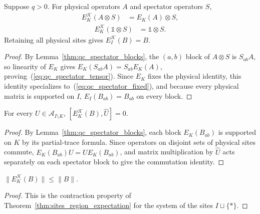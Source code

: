 \begin{lemma}
    \label{thm:qc_spectator_factors}
    \leanok
    Suppose $q>0$. For physical operators $A$ and spectator operators $S$,
    \begin{align}
        E_K^{\mathcal K}(A\otimes S) & =E_K(A)\otimes S,
        \label{eq:qc_spectator_tensor}
    \end{align}
    \begin{align}
        E_K^{\mathcal K}(\mathbb 1\otimes S) & =\mathbb 1\otimes S.
        \label{eq:qc_spectator_fixed}
    \end{align}
    Retaining all physical sites gives $E_I^{\mathcal K}(B)=B$.
\end{lemma}
\begin{proof}
    \leanok
    By Lemma~\ref{thm:qc_spectator_blocks}, the $(a,b)$ block of $A\otimes S$ is $S_{ab}A$, so linearity of $E_K$
    gives $E_K(S_{ab}A)=S_{ab}E_K(A)$, proving~(\ref{eq:qc_spectator_tensor}).
    Since $E_K$ fixes the physical identity, this identity
    specializes to~(\ref{eq:qc_spectator_fixed}), and because every physical
    matrix is supported on $I$, $E_I(B_{ab})=B_{ab}$ on every block.
\end{proof}

\begin{lemma}
    \label{thm:qc_spectator_commutant}
    \leanok
    For every $U\in\mathcal A_{I\setminus K}$,
    $[E_K^{\mathcal K}(B),\widehat U]=0$.
\end{lemma}
\begin{proof}
    \leanok
    By Lemma~\ref{thm:qc_spectator_blocks}, each block $E_K(B_{ab})$ is supported on $K$ by its partial-trace
    formula. Since operators on disjoint sets of physical sites commute,
    $E_K(B_{ab})U=UE_K(B_{ab})$, and matrix multiplication by $\widehat U$
    acts separately on each spectator block to give the commutation identity.
\end{proof}

\begin{lemma}
    \label{thm:qc_spectator_contraction}
    \leanok
    $\|E_K^{\mathcal K}(B)\|\le\|B\|$.
\end{lemma}
\begin{proof}
    \leanok
    This is the contraction property of Theorem~\ref{thm:sites_region_expectation}
    for the system of the sites $I\sqcup\{\ast\}$.
\end{proof}

